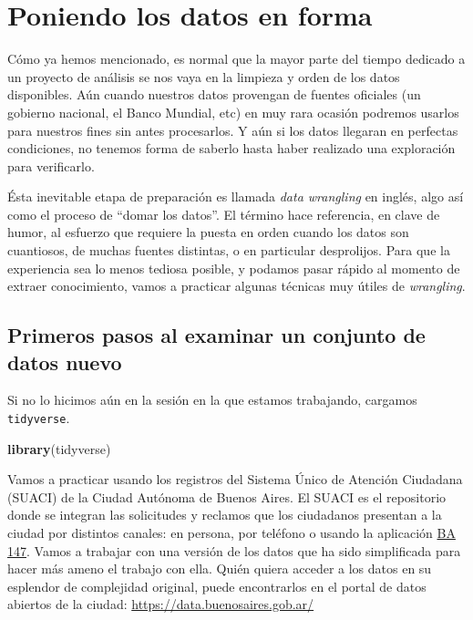 \documentclass[]{book}
\newenvironment{Shaded}{\begin{snugshade}}{\end{snugshade}}
\newcommand{\KeywordTok}[1]{\textcolor[rgb]{0.13,0.29,0.53}{\textbf{#1}}}
\newcommand{\NormalTok}[1]{#1}
\begin{document}
\chapter{Poniendo los datos en forma}\label{poniendo-los-datos-en-forma}

Cómo ya hemos mencionado, es normal que la mayor parte del tiempo
dedicado a un proyecto de análisis se nos vaya en la limpieza y orden de
los datos disponibles. Aún cuando nuestros datos provengan de fuentes
oficiales (un gobierno nacional, el Banco Mundial, etc) en muy rara
ocasión podremos usarlos para nuestros fines sin antes procesarlos. Y
aún si los datos llegaran en perfectas condiciones, no tenemos forma de
saberlo hasta haber realizado una exploración para verificarlo.

Ésta inevitable etapa de preparación es llamada \emph{data wrangling} en
inglés, algo así como el proceso de ``domar los datos''. El término hace
referencia, en clave de humor, al esfuerzo que requiere la puesta en
orden cuando los datos son cuantiosos, de muchas fuentes distintas, o en
particular desprolijos. Para que la experiencia sea lo menos tediosa
posible, y podamos pasar rápido al momento de extraer conocimiento,
vamos a practicar algunas técnicas muy útiles de \emph{wrangling}.

\section{Primeros pasos al examinar un conjunto de datos
nuevo}\label{primeros-pasos-al-examinar-un-conjunto-de-datos-nuevo}

Si no lo hicimos aún en la sesión en la que estamos trabajando, cargamos
\texttt{tidyverse}.

\begin{Shaded}
\begin{Highlighting}[]
\KeywordTok{library}\NormalTok{(tidyverse)}
\end{Highlighting}
\end{Shaded}

Vamos a practicar usando los registros del Sistema Único de Atención
Ciudadana (SUACI) de la Ciudad Autónoma de Buenos Aires. El SUACI es el
repositorio donde se integran las solicitudes y reclamos que los
ciudadanos presentan a la ciudad por distintos canales: en persona, por
teléfono o usando la aplicación
\href{https://gestioncolaborativa.buenosaires.gob.ar/prestaciones}{BA
147}. Vamos a trabajar con una versión de los datos que ha sido
simplificada para hacer más ameno el trabajo con ella. Quién quiera
acceder a los datos en su esplendor de complejidad original, puede
encontrarlos en el portal de datos abiertos de la ciudad:
\url{https://data.buenosaires.gob.ar/}
\end{document}
